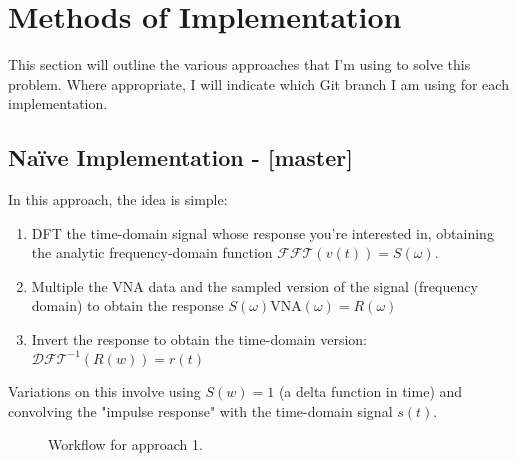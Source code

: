 \section{Methods of Implementation}
\label{sec:methods of implementation}

This section will outline the various approaches that I'm using to solve this
problem. Where appropriate, I will indicate which Git branch I am using for each
implementation.
\subsection{Na\"{i}ve Implementation - [master]}
\label{sub:naive_implemenation_master}



In this approach, the idea is simple:

\begin{enumerate}
  \item DFT the time-domain signal whose response you're
    interested in, obtaining the analytic frequency-domain function
    \subitem $\mathcal{FFT}(v(t)) = S(\omega)$.
  \item Multiple the VNA data and the sampled version of the signal (frequency
    domain) to obtain the response
    \subitem $ S(\omega)\textrm{VNA}(\omega) = R(\omega) $
  \item Invert the response to obtain the time-domain version:
    \subitem $\mathcal{DFT}^{-1}(R(w)) = r(t)$
\end{enumerate}

Variations on this involve using $S(w) = 1$ (a delta function in time) and
convolving the "impulse response" with the time-domain signal $ s(t) $.

\begin{figure}[h]
  \centering
  \caption{Workflow for approach 1.}
  \label{fig:approach_1_graph}
\end{figure}


